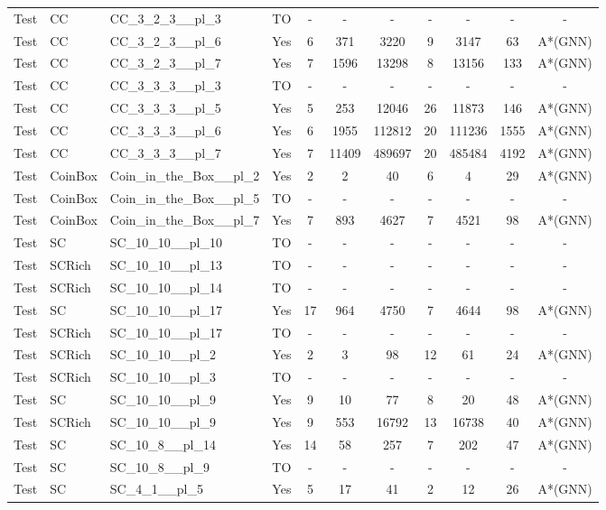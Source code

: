 \documentclass{article}
\begin{document}
\begin{tabular}{lllcccccccc}
Test & CC & CC\_3\_2\_3\_\_pl\_3 & TO & - & - & - & - & - & - & - \\
Test & CC & CC\_3\_2\_3\_\_pl\_6 & Yes & 6 & 371 & 3220 & 9 & 3147 & 63 & A*(GNN) \\
Test & CC & CC\_3\_2\_3\_\_pl\_7 & Yes & 7 & 1596 & 13298 & 8 & 13156 & 133 & A*(GNN) \\
Test & CC & CC\_3\_3\_3\_\_pl\_3 & TO & - & - & - & - & - & - & - \\
Test & CC & CC\_3\_3\_3\_\_pl\_5 & Yes & 5 & 253 & 12046 & 26 & 11873 & 146 & A*(GNN) \\
Test & CC & CC\_3\_3\_3\_\_pl\_6 & Yes & 6 & 1955 & 112812 & 20 & 111236 & 1555 & A*(GNN) \\
Test & CC & CC\_3\_3\_3\_\_pl\_7 & Yes & 7 & 11409 & 489697 & 20 & 485484 & 4192 & A*(GNN) \\
Test & CoinBox & Coin\_in\_the\_Box\_\_pl\_2 & Yes & 2 & 2 & 40 & 6 & 4 & 29 & A*(GNN) \\
Test & CoinBox & Coin\_in\_the\_Box\_\_pl\_5 & TO & - & - & - & - & - & - & - \\
Test & CoinBox & Coin\_in\_the\_Box\_\_pl\_7 & Yes & 7 & 893 & 4627 & 7 & 4521 & 98 & A*(GNN) \\
Test & SC & SC\_10\_10\_\_pl\_10 & TO & - & - & - & - & - & - & - \\
Test & SCRich & SC\_10\_10\_\_pl\_13 & TO & - & - & - & - & - & - & - \\
Test & SCRich & SC\_10\_10\_\_pl\_14 & TO & - & - & - & - & - & - & - \\
Test & SC & SC\_10\_10\_\_pl\_17 & Yes & 17 & 964 & 4750 & 7 & 4644 & 98 & A*(GNN) \\
Test & SCRich & SC\_10\_10\_\_pl\_17 & TO & - & - & - & - & - & - & - \\
Test & SCRich & SC\_10\_10\_\_pl\_2 & Yes & 2 & 3 & 98 & 12 & 61 & 24 & A*(GNN) \\
Test & SCRich & SC\_10\_10\_\_pl\_3 & TO & - & - & - & - & - & - & - \\
Test & SC & SC\_10\_10\_\_pl\_9 & Yes & 9 & 10 & 77 & 8 & 20 & 48 & A*(GNN) \\
Test & SCRich & SC\_10\_10\_\_pl\_9 & Yes & 9 & 553 & 16792 & 13 & 16738 & 40 & A*(GNN) \\
Test & SC & SC\_10\_8\_\_pl\_14 & Yes & 14 & 58 & 257 & 7 & 202 & 47 & A*(GNN) \\
Test & SC & SC\_10\_8\_\_pl\_9 & TO & - & - & - & - & - & - & - \\
Test & SC & SC\_4\_1\_\_pl\_5 & Yes & 5 & 17 & 41 & 2 & 12 & 26 & A*(GNN) \\

\end{tabular}
\end{document}
